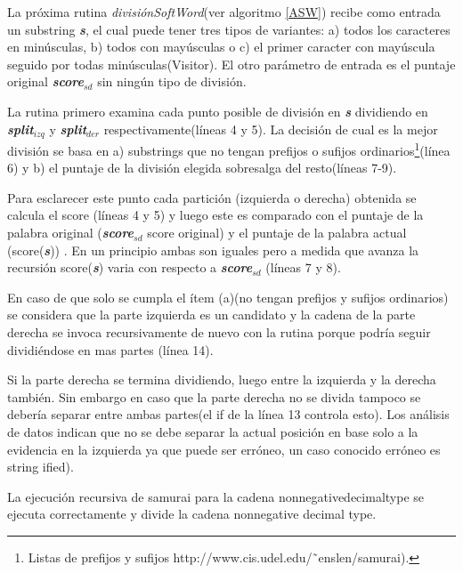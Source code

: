 \documentclass[a4paper,12pt]{report}
\begin{document}
La próxima rutina \textit{divisiónSoftWord}(ver algoritmo \ref{ASW}) recibe como entrada un substring \textbf{\textit{s}}, el cual puede tener tres tipos de variantes: a) todos los caracteres en minúsculas, b) todos con mayúsculas o c) el primer caracter con mayúscula seguido por todas minúsculas(\textsf{Visitor}). El otro parámetro de entrada es el puntaje original \textbf{\textit{score$_{sd}$}} sin ningún tipo de división.

La rutina primero examina cada punto posible de división en \textbf{\textit{s}} dividiendo en \textbf{\textit{split$_{izq}$}} y \textbf{\textit{split$_{der}$}} respectivamente(líneas 4 y 5). La decisión de cual es la mejor división se basa en a) substrings que no tengan prefijos o sufijos ordinarios\footnote[1]{Listas de prefijos y sufijos http://www.cis.udel.edu/˜enslen/samurai).}(línea 6) y b) el puntaje de la división elegida sobresalga del resto(líneas 7-9). 

Para esclarecer este punto cada partición (izquierda o derecha) obtenida se calcula el score (líneas 4 y 5) y luego este es comparado con el puntaje de la palabra original (\textbf{\textit{score$_{sd}$}} score original) y el puntaje de la palabra actual (score(\textbf{\textit{s}})) . En un principio ambas son iguales pero a medida que avanza la recursión score(\textbf{\textit{s}}) varia con respecto a \textbf{\textit{score$_{sd}$}} (líneas 7 y 8).

En caso de que solo se cumpla el ítem (a)(no tengan prefijos y sufijos ordinarios) se considera que la parte izquierda es un candidato y la cadena de la parte derecha se invoca recursivamente de nuevo con la rutina porque podría seguir dividiéndose en mas partes (línea 14).

Si la parte derecha se termina dividiendo, luego entre la izquierda y la derecha también. Sin embargo en caso que la parte derecha no se divida tampoco se debería separar entre ambas partes(el \textsf{if} de la línea 13 controla esto). Los análisis de datos\cite{EHPV09} indican que no se debe separar la actual posición en base solo a la evidencia en la izquierda ya que puede ser erróneo, un caso conocido erróneo es \textsf{string ified}). 

La ejecución recursiva de samurai para la cadena \textsf{nonnegativedecimaltype} se ejecuta correctamente y divide la cadena \textsf{nonnegative decimal type}\cite{EHPV09}.
\end{document}
